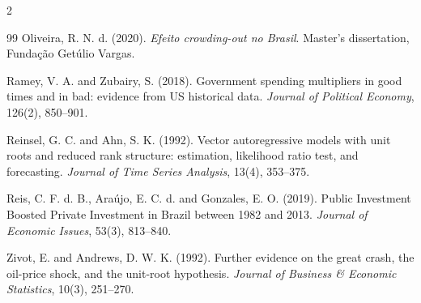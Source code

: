 \documentclass[11pt,a4paper]{article}
\begin{document}
\begin{multicols}{2}
\begin{thebibliography}{99}
Oliveira, R. N. d. (2020). \textit{Efeito crowding-out no Brasil}. Master's dissertation, Fundação Getúlio Vargas.

Ramey, V. A. and Zubairy, S. (2018). Government spending multipliers in good times and in bad: evidence from US historical data. \textit{Journal of Political Economy}, 126(2), 850--901.

Reinsel, G. C. and Ahn, S. K. (1992). Vector autoregressive models with unit roots and reduced rank structure: estimation, likelihood ratio test, and forecasting. \textit{Journal of Time Series Analysis}, 13(4), 353--375.

Reis, C. F. d. B., Araújo, E. C. d. and Gonzales, E. O. (2019). Public Investment Boosted Private Investment in Brazil between 1982 and 2013. \textit{Journal of Economic Issues}, 53(3), 813--840.

Zivot, E. and Andrews, D. W. K. (1992). Further evidence on the great crash, the oil-price shock, and the unit-root hypothesis. \textit{Journal of Business \& Economic Statistics}, 10(3), 251--270.

\end{thebibliography}
\end{multicols}
\end{document}
